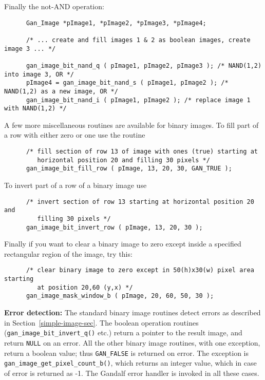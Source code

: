 Finally the not-AND operation:
\begin{verbatim}
      Gan_Image *pImage1, *pImage2, *pImage3, *pImage4;

      /* ... create and fill images 1 & 2 as boolean images, create image 3 ... */

      gan_image_bit_nand_q ( pImage1, pImage2, pImage3 ); /* NAND(1,2) into image 3, OR */
      pImage4 = gan_image_bit_nand_s ( pImage1, pImage2 ); /* NAND(1,2) as a new image, OR */
      gan_image_bit_nand_i ( pImage1, pImage2 ); /* replace image 1 with NAND(1,2) */
\end{verbatim}

A few more miscellaneous routines are available for binary images.
To fill part of a row with either zero or one use the routine
\begin{verbatim}
      /* fill section of row 13 of image with ones (true) starting at
         horizontal position 20 and filling 30 pixels */
      gan_image_bit_fill_row ( pImage, 13, 20, 30, GAN_TRUE );
\end{verbatim}
To invert part of a row of a binary image use
\begin{verbatim}
      /* invert section of row 13 starting at horizontal position 20 and
         filling 30 pixels */
      gan_image_bit_invert_row ( pImage, 13, 20, 30 );
\end{verbatim}
Finally if you want to clear a binary image to zero except inside a
specified rectangular region of the image, try this:
\begin{verbatim}
      /* clear binary image to zero except in 50(h)x30(w) pixel area starting
         at position 20,60 (y,x) */
      gan_image_mask_window_b ( pImage, 20, 60, 50, 30 );
\end{verbatim}

{\bf Error detection:} The standard binary image routines detect errors
as described in Section~\ref{simple-image-sec}. The boolean operation
routines ({\tt gan\_image\_bit\_invert\_q()} etc.) return a pointer to
the result image, and return {\tt NULL} on an error. All the other binary
image routines, with one exception, return a boolean value;
thus {\tt GAN\_FALSE} is returned on error. The exception is
{\tt gan\_image\_get\_pixel\_count\_b()}, which returns an integer
value, which in case of error is returned as -1.
The Gandalf error handler is invoked in all these cases.

